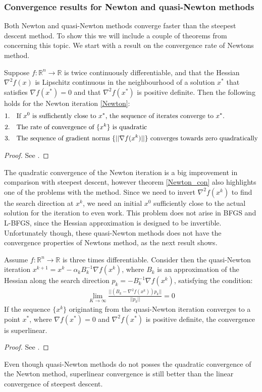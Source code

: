 \subsubsection{Convergence results for Newton and quasi-Newton methods}
Both Newton and quasi-Newton methods converge faster than the steepest descent method. To show this we will include a couple of theorems from \cite{nocedal2006numerical}
concerning this topic. We start with a result on the convergence rate of Newtons method.
\begin{theorem}
\label{Newton_con}
Suppose $f:\mathbb{R}^n\rightarrow\mathbb{R}$ is twice continuously differentiable, and that the Hessian $\nabla^2 f(x)$ is Lipschitz continuous in the neighbourhood of a solution $x^*$ that satisfies $\nabla f(x^*)=0$ and that $\nabla^2 f(x^*)$ is positive definite. Then the following holds for the Newton iteration \ref{Newton}:
\begin{align*}
1.\quad&\textrm{If $x^0$ is suffichently close to $x^*$, the sequence of iterates converge to $x^*$.}\\
2.\quad&\textrm{The rate of convergence of $\{x^k\}$ is quadratic}\\
3.\quad&\textrm{The sequence of gradient norms $ \{||\nabla f(x^k)||\}$ converges towards zero quadratically}
\end{align*}
\end{theorem}
\begin{proof}
See \cite{nocedal2006numerical}.
\end{proof}
\noindent
The quadratic convergence of the Newton iteration is a big improvement in comparison with steepest descent, however theorem \ref{Newton_con} also highlights one of the problems with the method. Since we need to invert $\nabla^2 f(x^k)$ to find the search direction at $x^k$, we need an initial $x^0$ sufficiently close to the actual solution for the iteration to even work. This problem does not arise in BFGS and L-BFGS, since the Hessian approximation is designed to be invertible. Unfortunately though, these quasi-Newton methods does not have the convergence properties of Newtons method, as the next result shows.
\begin{theorem}
Assume $f:\mathbb{R}^n\rightarrow\mathbb{R}$ is three times differentiable. Consider then the quasi-Newton iteration $x^{k+1}=x^k-\alpha_k B_k^{-1}\nabla f(x^k)$, where $B_k$ is an approximation of the Hessian along the search direction $p_k=-B_k^{-1}\nabla f(x^k)$, satisfying the condition:
\begin{align*}
\lim_{K\rightarrow\infty}\frac{||(B_k-\nabla^2f(x^k))p_k||}{||p_k||}=0
\end{align*}
If the sequence $\{x^k\}$ originating from the quasi-Newton iteration converges to a point $x^*$, where $\nabla f(x^*)=0$ and $\nabla^2 f(x^*)$ is positive definite, the convergence is superlinear. 
\end{theorem} 
\begin{proof}
See \cite{nocedal2006numerical}.
\end{proof}
\noindent
Even though quasi-Newton methods do not posses the quadratic convergence of the Newton method, superlinear convergence is still better than the linear convergence of steepest descent. 
